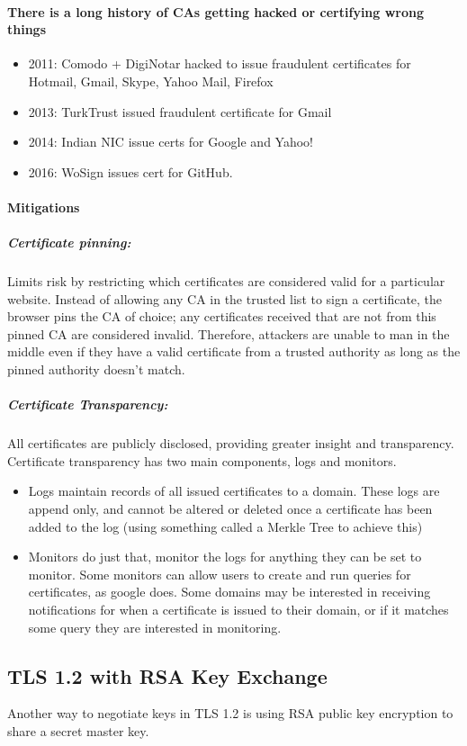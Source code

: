 \documentclass[11pt]{article} %
\begin{document}
\paragraph{There is a long history of CAs getting hacked or certifying wrong things}
 \begin{itemize}
    \item 2011: Comodo + DigiNotar hacked to issue fraudulent certificates for Hotmail, Gmail, Skype, Yahoo Mail, Firefox
    \item 2013: TurkTrust issued fraudulent certificate for Gmail
    \item 2014: Indian NIC issue certs for Google and Yahoo!
    \item 2016: WoSign issues cert for GitHub.
\end{itemize}
\paragraph{Mitigations}
\subparagraph {Certificate pinning:} Limits risk by restricting which certificates are considered valid for a particular website. Instead of allowing any CA in the trusted list to sign a certificate, the browser pins the CA of choice; any certificates received that are not from this pinned CA are considered invalid. Therefore, attackers are unable to man in the middle even if they have a valid certificate from a trusted authority as long as the pinned authority doesn't match.
\subparagraph {Certificate Transparency:} All certificates are publicly disclosed, providing greater insight and transparency. Certificate transparency has two main components, logs and monitors.
 \begin{itemize}
    \item Logs maintain records of all issued certificates to a domain. These logs are append only, and cannot be altered or deleted once a certificate has been added to the log (using something called a Merkle Tree to achieve this)
    \item Monitors do just that, monitor the logs for anything they can be set to monitor. Some monitors can allow users to create and run queries for certificates, as google does. Some domains may be interested in receiving notifications for when a certificate is issued to their domain, or if it matches some query they are interested in monitoring.
\end{itemize}

\newpage
\subsection{TLS 1.2 with RSA Key Exchange}
Another way to negotiate keys in TLS 1.2 is using RSA public key encryption to 
share a secret master key.
\end{document}
